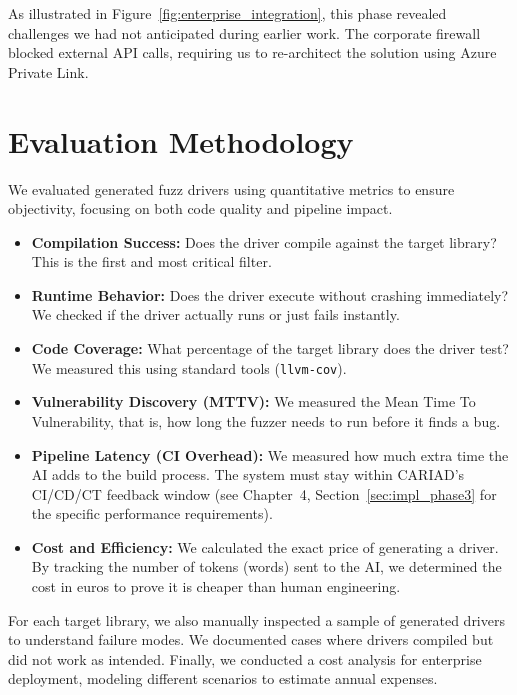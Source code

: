 As illustrated in Figure~\ref{fig:enterprise_integration}, this phase revealed challenges we had not anticipated during earlier work. The corporate firewall blocked external API calls, requiring us to re-architect the solution using Azure Private Link.

\section{Evaluation Methodology}
\label{sec:meth_evaluation}

We evaluated generated fuzz drivers using quantitative metrics to ensure objectivity, focusing on both code quality and pipeline impact.

\begin{itemize}
    \item \textbf{Compilation Success:} Does the driver compile against the target library? This is the first and most critical filter.
    \item \textbf{Runtime Behavior:} Does the driver execute without crashing immediately? We checked if the driver actually runs or just fails instantly.
    \item \textbf{Code Coverage:} What percentage of the target library does the driver test? We measured this using standard tools (\texttt{llvm-cov}).
    \item \textbf{Vulnerability Discovery (MTTV):} We measured the Mean Time To Vulnerability, that is, how long the fuzzer needs to run before it finds a bug.
    \item \textbf{Pipeline Latency (CI Overhead):} We measured how much extra time the AI adds to the build process. The system must stay within CARIAD's CI/CD/CT feedback window (see Chapter~4, Section~\ref{sec:impl_phase3} for the specific performance requirements).
    \item \textbf{Cost and Efficiency:} We calculated the exact price of generating a driver. By tracking the number of tokens (words) sent to the AI, we determined the cost in euros to prove it is cheaper than human engineering.
\end{itemize}

For each target library, we also manually inspected a sample of generated drivers to understand failure modes. We documented cases where drivers compiled but did not work as intended. Finally, we conducted a cost analysis for enterprise deployment, modeling different scenarios to estimate annual expenses.